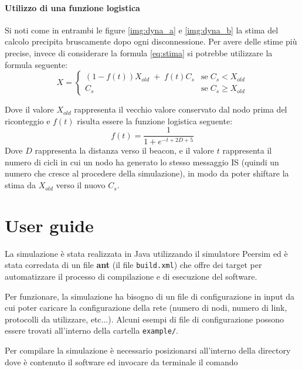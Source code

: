 \documentclass[a4paper,12pt]{article}
\begin{document}
\paragraph{Utilizzo di una funzione logistica}
Si noti come in entrambi le figure \ref{img:dyna_a} e \ref{img:dyna_b} la stima del calcolo precipita bruscamente dopo ogni disconnessione. Per avere delle stime pi\`u precise, invece di considerare la formula \ref{eq:stima} si potrebbe utilizzare la formula seguente:
\begin{equation}\label{eq:stima_log}
X = \left\{
\begin{array}{ll}
(1 - f(t)) X_{old} \;+\; f(t) C_s & \mbox{se}\; C_s < X_{old}\\
C_s & \mbox{se}\; C_s \geq X_{old}
\end{array}
\right.
\end{equation}

Dove il valore $X_{old}$ rappresenta il vecchio valore conservato dal nodo prima del riconteggio e $f(t)$ risulta essere la funzione logistica seguente:
\begin{equation}\label{eq:logistica}
f(t) = \frac{1}{1 + e^{-t + 2D + 5}}
\end{equation}
Dove $D$ rappresenta la distanza verso il beacon, e il valore $t$ rappresenta il numero di cicli in cui un nodo ha generato lo stesso messaggio IS (quindi un numero che cresce al procedere della simulazione), in modo da poter shiftare la stima da $X_{old}$ verso il nuovo $C_s$.

\section{User guide}
\label{sec:guide}

La simulazione \`e stata realizzata in Java utilizzando il simulatore Peersim ed \`e stata corredata di un file \textbf{ant} (il file \texttt{build.xml}) che offre dei target per automatizzare il processo di compilazione e di esecuzione del software.

Per funzionare, la simulazione ha bisogno di un file di configurazione in input da cui poter caricare la configurazione della rete (numero di nodi, numero di link, protocolli da utilizzare, etc...). Alcuni esempi di file di configurazione possono essere trovati all'interno della cartella \texttt{example/}.

Per compilare la simulazione \`e necessario posizionarsi all'interno della directory dove \`e contenuto il software ed invocare da terminale il comando
\end{document}
